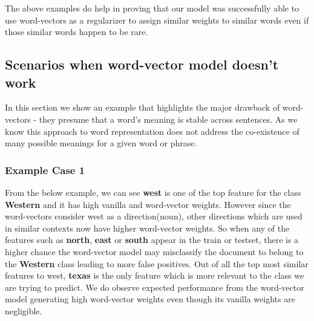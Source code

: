 The above examples do help in proving that our model was successfully able to use word-vectors as a regularizer to assign similar weights to similar words even if those similar words happen to be rare.

\newpage
\subsection{Scenarios when word-vector model doesn't work}

In this section we show an example that highlights the major drawback of word-vectors - they presume that a word's meaning is stable across sentences. As we know this approach to word representation does not address the co-existence of many possible meanings for a given word or phrase.

\subsubsection{Example Case 1}

From the below example, we can see \textbf{west} is one of the top feature for the class \textbf{Western} and it has high vanilla and word-vector weights. However since the word-vectors consider west as a direction(noun), other directions which are used in similar contexts now have higher word-vector weights. So when any of the features such as \textbf{north}, \textbf{east} or \textbf{south} appear in the train or testset, there is a higher chance the word-vector model may misclassify the document to belong to the \textbf{Western} class leading to more false positives. Out of all the top most similar features to west, \textbf{texas} is the only feature which is more relevant to the class we are trying to predict. We do observe expected performance from the word-vector model generating high word-vector weights even though its vanilla weights are negligible.

